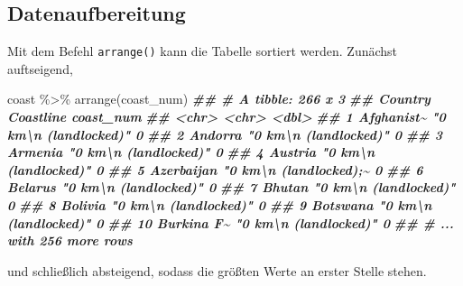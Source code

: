 \documentclass[
  ngerman,
]{article}
\newenvironment{Shaded}{\begin{snugshade}}{\end{snugshade}}
\newcommand{\DocumentationTok}[1]{\textcolor[rgb]{0.56,0.35,0.01}{\textbf{\textit{#1}}}}
\newcommand{\FunctionTok}[1]{\textcolor[rgb]{0.00,0.00,0.00}{#1}}
\newcommand{\NormalTok}[1]{#1}
\newcommand{\SpecialCharTok}[1]{\textcolor[rgb]{0.00,0.00,0.00}{#1}}
\begin{document}
\hypertarget{datenaufbereitung}{%
\subsection{Datenaufbereitung}\label{datenaufbereitung}}

Mit dem Befehl \texttt{arrange()} kann die Tabelle sortiert werden. Zunächst auftseigend,

\begin{Shaded}
\begin{Highlighting}[]
\NormalTok{coast }\SpecialCharTok{\%\textgreater{}\%}
  \FunctionTok{arrange}\NormalTok{(coast\_num)}
\DocumentationTok{\#\# \# A tibble: 266 x 3}
\DocumentationTok{\#\#    Country    Coastline                       coast\_num}
\DocumentationTok{\#\#    \textless{}chr\textgreater{}      \textless{}chr\textgreater{}                               \textless{}dbl\textgreater{}}
\DocumentationTok{\#\#  1 Afghanist\textasciitilde{} "0 km\textbackslash{}n          (landlocked)"          0}
\DocumentationTok{\#\#  2 Andorra    "0 km\textbackslash{}n          (landlocked)"          0}
\DocumentationTok{\#\#  3 Armenia    "0 km\textbackslash{}n          (landlocked)"          0}
\DocumentationTok{\#\#  4 Austria    "0 km\textbackslash{}n          (landlocked)"          0}
\DocumentationTok{\#\#  5 Azerbaijan "0 km\textbackslash{}n          (landlocked);\textasciitilde{}         0}
\DocumentationTok{\#\#  6 Belarus    "0 km\textbackslash{}n          (landlocked)"          0}
\DocumentationTok{\#\#  7 Bhutan     "0 km\textbackslash{}n          (landlocked)"          0}
\DocumentationTok{\#\#  8 Bolivia    "0 km\textbackslash{}n          (landlocked)"          0}
\DocumentationTok{\#\#  9 Botswana   "0 km\textbackslash{}n          (landlocked)"          0}
\DocumentationTok{\#\# 10 Burkina F\textasciitilde{} "0 km\textbackslash{}n          (landlocked)"          0}
\DocumentationTok{\#\# \# ... with 256 more rows}
\end{Highlighting}
\end{Shaded}

und schließlich absteigend, sodass die größten Werte an erster Stelle stehen.
\end{document}

